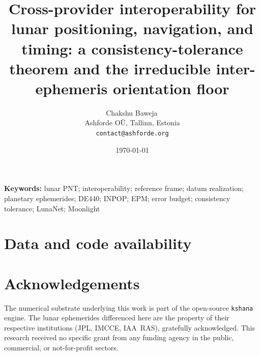 \documentclass[11pt]{article}
\title{\textbf{Cross-provider interoperability for lunar positioning,
navigation, and timing: a consistency-tolerance theorem and the irreducible
inter-ephemeris orientation floor}}
\author{Chakshu Baweja\,\orcidlink{0009-0008-2098-0751}\\
\small Ashforde O\"U, Tallinn, Estonia \\
\small \texttt{contact@ashforde.org}}
\date{\today}
\theoremstyle{definition}
\newcommand{\code}[1]{\texttt{#1}}
\begin{document}
\maketitle

\begin{abstract}

\end{abstract}

\noindent\textbf{Keywords:} lunar PNT; interoperability; reference frame; datum
realization; planetary ephemerides; DE440; INPOP; EPM; error budget; consistency
tolerance; LunaNet; Moonlight

\vspace{0.5em}









\section*{Data and code availability}


\section*{Acknowledgements}
The numerical substrate underlying this work is part of the open-source
\code{kshana} engine. The lunar ephemerides differenced here are the property of
their respective institutions (JPL, IMCCE, IAA~RAS), gratefully acknowledged. This
research received no specific grant from any funding agency in the public,
commercial, or not-for-profit sectors.




\appendix

\end{document}
